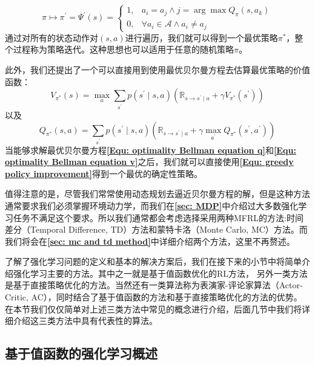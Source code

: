 \begin{equation}
\label{Equ: greedy policy improvement}
     \pi \mapsto \pi^{\prime}=\Psi^{\prime}(s)=\left\{\begin{array}{ll}
1, & a_{i}=a_{j} \wedge j=\arg \max Q_{\pi}\left(s, a_{k}\right) \\
0, & \forall a_{i} \in \mathcal{A} \wedge a_{i} \neq a_{j}
\end{array}\right.
\end{equation}
通过对所有的状态动作对$(s,a)$进行遍历，我们就可以得到一个最优策略$\pi^{*}$，整个过程称为策略迭代。这种思想也可以适用于任意的随机策略$\pi$。

此外，我们还提出了一个可以直接用到使用最优贝尔曼方程去估算最优策略的价值函数：
\begin{equation}
\label{Equ: optimality Bellman equation v}
    V_{\pi^{*}}(s)=\max _{a} \sum_{s^{\prime}} p\left(s^{\prime} \mid s, a\right)\left(\mathbb{R}_{s \rightarrow s^{\prime} \mid a}+\gamma V_{\pi^{*}}\left(s^{\prime}\right)\right)
\end{equation}
以及
\begin{equation}
\label{Equ: optimality Bellman equation q}
Q_{\pi^{*}}(s, a)=\sum_{s^{\prime}} p\left(s^{\prime} \mid s, a\right)\left(\mathbb{R}_{s \rightarrow s^{\prime} \mid a}+\gamma \max _{a^{\prime}} Q_{\pi^{*}}\left(s^{\prime}, a^{\prime}\right)\right)
\end{equation}
当能够求解最优贝尔曼方程\textbf{\eqref{Equ: optimality Bellman equation q}}和\textbf{\eqref{Equ: optimality Bellman equation v}}之后，我们就可以直接使用\textbf{\eqref{Equ: greedy policy improvement}}得到一个最优的确定性策略。

值得注意的是，尽管我们常常使用动态规划去逼近贝尔曼方程的解，但是这种方法通常要求我们必须掌握环境动力学，而我们在\textbf{\ref{sec: MDP}}中介绍过大多数强化学习任务不满足这个要求。所以我们通常都会考虑选择采用两种MFRL的方法:时间差分（Temporal Difference, TD）方法和蒙特卡洛（Monte Carlo, MC）方法。而我们将会在\textbf{\ref{sec: mc and td method}}中详细介绍两个方法，这里不再赘述。


了解了强化学习问题的定义和基本的解决方案后，我们在接下来的小节中将简单介绍强化学习主要的方法。其中之一就是基于值函数优化的RL方法， 另外一类方法是基于直接策略优化的方法。当然还有一类算法称为表演家-评论家算法（Actor-Critic, AC），同时结合了基于值函数的方法和基于直接策略优化的方法的优势。在本节我们仅仅简单对上述三类方法中常见的概念进行介绍，后面几节中我们将详细介绍这三类方法中具有代表性的算法。

\subsection{基于值函数的强化学习概述}

